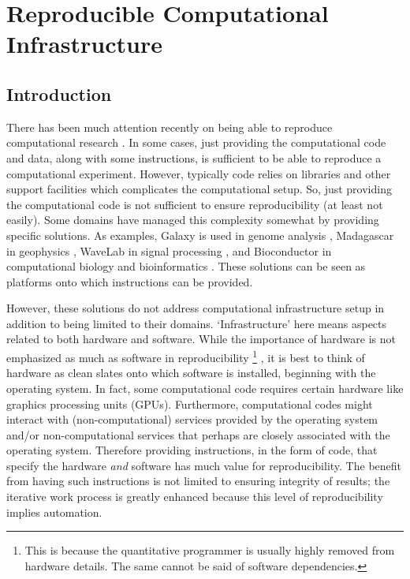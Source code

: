 \chapter{Reproducible Computational Infrastructure}


\section{Introduction}


There has been much attention recently on being able to reproduce computational research \cite{Stodden2013}. 
%
In some cases, just providing the computational code and data, along with some instructions, is sufficient to be able to reproduce a computational experiment.
%
However, typically code relies on libraries and other support facilities which complicates the computational setup.
%
So, just providing the computational code is not sufficient to ensure reproducibility (at least not easily).
%
Some domains have managed this complexity somewhat by providing specific solutions.
%
As examples, \textsf{Galaxy} is used in genome analysis \cite{Giardine2005},
%
\textsf{Madagascar} in geophysics \cite{Fomel2013},
%
\textsf{WaveLab} in signal processing \cite{Buckheit1995},
%
and \textsf{Bioconductor} in computational biology and bioinformatics \cite{Gentleman2004}.
%
These solutions can be seen as platforms onto which instructions can be provided.


However, these solutions do not address computational infrastructure setup in addition to being limited to their domains.
%
`Infrastructure' here means aspects related to both hardware and software.
%
While the importance of hardware is not emphasized as much as software in reproducibility%
\footnote{This is because the quantitative programmer is usually highly removed from hardware details. The same cannot be said of software dependencies.}%
,
it is best to think of hardware as clean slates onto which software is installed, beginning with the operating system.
%
In fact, some computational code requires certain hardware like graphics processing units (GPUs).
%
Furthermore, computational codes might interact with (non-computational) services provided by the operating system and/or non-computational services that perhaps are closely associated with the operating system.
%
Therefore providing instructions, in the form of code, that specify the hardware \emph{and} software has much value for reproducibility.
%
The benefit from having such instructions is not limited to ensuring integrity of results;
%
the iterative work process is greatly enhanced because this level of reproducibility implies automation.



